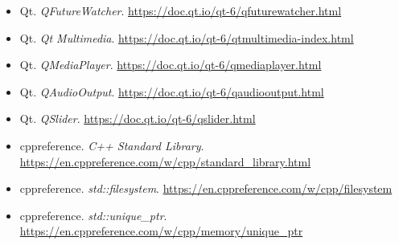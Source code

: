\documentclass[10pt,a4paper]{article}
\begin{document}
\begin{itemize}
    \item Qt. \textit{QFutureWatcher}.
    \url{https://doc.qt.io/qt-6/qfuturewatcher.html}

    \item Qt. \textit{Qt Multimedia}.
    \url{https://doc.qt.io/qt-6/qtmultimedia-index.html}

    \item Qt. \textit{QMediaPlayer}.
    \url{https://doc.qt.io/qt-6/qmediaplayer.html}

    \item Qt. \textit{QAudioOutput}.
    \url{https://doc.qt.io/qt-6/qaudiooutput.html}

    \item Qt. \textit{QSlider}.
    \url{https://doc.qt.io/qt-6/qslider.html}

    \item cppreference. \textit{C++ Standard Library}.
    \url{https://en.cppreference.com/w/cpp/standard_library.html}

    \item cppreference. \textit{std::filesystem}.
    \url{https://en.cppreference.com/w/cpp/filesystem}
    \item cppreference. \textit{std::unique\_ptr}.
    \url{https://en.cppreference.com/w/cpp/memory/unique_ptr}

\end{itemize}
\end{document}
